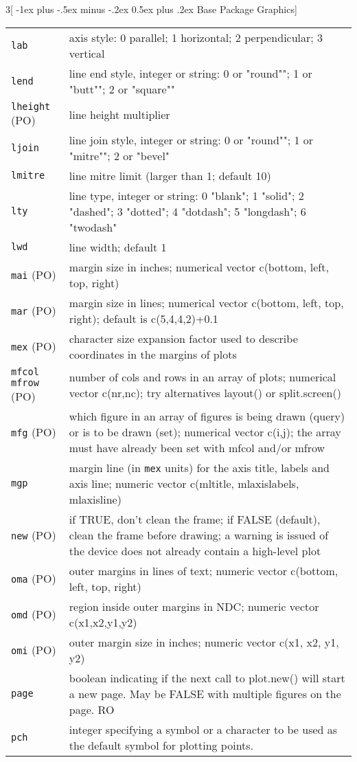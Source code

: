 \documentclass[landscape]{article}
\makeatletter
\renewcommand{\section}{\@startsection{section}{1}{0mm}%
                                {-1ex plus -.5ex minus -.2ex}%
                                {0.5ex plus .2ex}%
                                {\normalfont\large\bfseries}}
\makeatother
\begin{document}
\begin{multicols}{3}[\section{Base Package Graphics}]
\begin{tabular}[t]{@{}p{\widthleftcol}p{\widthrightcol}@{}}
\hline
\verb|lab| & axis style: 0 parallel; 1 horizontal; 2 perpendicular; 3 vertical \\
\verb|lend| & line end style, integer or string: 0 or "round""; 1 or "butt""; 2 or "square"" \\
\verb|lheight| (PO) & line height multiplier \\
\verb|ljoin| & line join style, integer or string: 0 or "round""; 1 or "mitre""; 2 or "bevel" \\
\verb|lmitre| & line mitre limit (larger than 1; default 10) \\
\verb|lty| & line type, integer or string: 0 "blank"; 1 "solid"; 2 "dashed"; 3 "dotted"; 4 "dotdash"; 5 "longdash"; 6 "twodash" \\
\verb|lwd| & line width; default 1 \\
\verb|mai| (PO) & margin size in inches; numerical vector c(bottom, left, top, right) \\
\verb|mar| (PO) & margin size in lines; numerical vector c(bottom, left, top, right); default is c(5,4,4,2)+0.1 \\
\verb|mex| (PO) & character size expansion factor used to describe coordinates in the margins of plots \\
\parbox[t]{\widthleftcol}{
    \texttt{mfcol} \\
    \texttt{mfrow} (PO)
    } & number of cols and rows in an array of plots; numerical vector c(nr,nc); try alternatives layout() or split.screen()  \\
\verb|mfg| (PO) & which figure in an array of figures is being drawn (query) or is to be drawn (set); numerical vector c(i,j); the array must have already been set with mfcol and/or mfrow \\
\verb|mgp| & margin line (in \verb|mex| units) for the axis title, labels and axis line; numeric vector c(mltitle, mlaxislabels, mlaxisline) \\
\verb|new| (PO) & if TRUE, don't clean the frame; if FALSE (default), clean the frame before drawing; a warning is issued of the device does not already contain a high-level plot \\
\verb|oma| (PO) & outer margins in lines of text; numeric vector c(bottom, left, top, right) \\
\verb|omd| (PO) & region inside outer margins in NDC; numeric vector c(x1,x2,y1,y2) \\
\verb|omi| (PO) & outer margin size in inches; numeric vector c(x1, x2, y1, y2) \\
\verb|page| & boolean indicating if the next call to plot.new() will start  a new page. May be FALSE with multiple figures on the page. RO \\
\verb|pch| & integer specifying a symbol or a character to be used as the default symbol for plotting points. \\
\hline 
\end{tabular}


\end{multicols}
\end{document}
